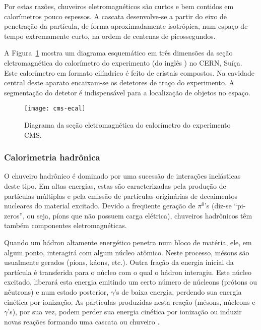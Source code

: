 Por estas razões, chuveiros eletromagnéticos são curtos e bem contidos em
calorímetros pouco espessos. A cascata desenvolve-se a partir do eixo de
penetração da par\-tí\-cu\-la, de forma aproximadamente isotrópica, num espaço
de tempo extremamente curto, na ordem de centenas de picossegundos.

A Figura~\ref{fig:cms-ecal} mostra um diagrama esquemático em três dimensões
da seção eletromagnética do calorímetro do experimento  (do inglês
) no CERN, Suíça. Este calorímetro em formato
cilíndrico é feito de cristais compostos. Na cavidade central deste aparato
encaixam-se os detetores de traço do experimento. A segmentação do detetor é
indispensável para a localização de objetos no espaço.

\begin{figure}
\begin{center}
\texttt{[image: cms-ecal]}
\end{center}
\caption{Diagrama da seção eletromagnética do calorímetro do experimento CMS.}
\label{fig:cms-ecal}
\end{figure}

\subsubsection{Calorimetria hadrônica}
\label{sec:calohad}

O chuveiro hadrônico é dominado por uma sucessão de interações inelásticas
deste tipo. Em altas energias, estas são caracterizadas pela produção de
partículas múltiplas e pela emissão de partículas originárias de decaimentos
nucleares do material excitado. Devido a freqüente geração de $\pi^{0}$'s
(diz-se ``pi-zeros'', ou seja, píons que não possuem carga elétrica),
chuveiros hadrônicos têm também componentes eletromagnéticas.

Quando um hádron altamente ener\-gé\-tico penetra num bloco de ma\-té\-ria,
ele, em algum ponto, interagi\-rá com algum nú\-cleo atômico. Neste processo,
mésons são usualmente gerados (píons, káons, etc.). Outra fração da energia
inicial da partícula é transferida para o núcleo com o qual o hádron
interagiu. Este núcleo excitado, liberará esta energia emitindo um certo
nú\-mero de nú\-cleons (prótons ou nêutrons) e num estado posterior,
$\gamma$'s de baixa energia, perdendo sua energia cinética por ionização. As
partículas produzidas nesta reação (mésons, núcleons e $\gamma$'s), por sua
vez, podem perder sua energia cinética por ionização ou induzir novas reações
formando uma cascata ou chuveiro \cite{hadcal}.


